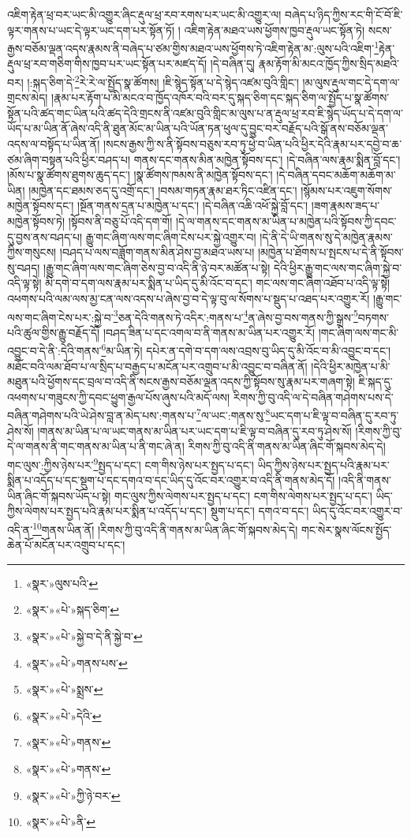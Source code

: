 འཇིག་རྟེན་ཕྲ་བར་ཡང་མི་འགྱུར་ཞིང་རྡུལ་ཕྲ་རབ་རགས་པར་ཡང་མི་འགྱུར་ལ། བཞེད་པ་ཉིད་ཀྱིས་རང་གི་ངོ་བོ་ཇི་ལྟར་གནས་པ་ཡང་དེ་ལྟར་ཡང་དག་པར་སྟོན་ཏོ། །
འཇིག་རྟེན་མཐའ་ཡས་ཕྱོགས་ཁྱབ་རྡུལ་ཡང་སྟོན་ཏེ། སངས་རྒྱས་བཅོམ་ལྡན་འདས་རྣམས་ནི་བཞེད་པ་ཙམ་གྱིས་མཐའ་ཡས་ཕྱོགས་ཏེ་འཇིག་རྟེན་མ་:ལུས་པའི་འཇིག་\footnote{«སྣར་»ལུས་པའི་}རྟེན་རྡུལ་ཕྲ་རབ་གཅིག་གིས་ཁྱབ་པར་ཡང་སྟོན་པར་མཛད་དོ། །དེ་བཞིན་དུ། རྣམ་རྟོག་མི་མངའ་ཁྱོད་ཀྱིས་སྲིད་མཐའི་བར། །:སྐད་ཅིག་དེ་\footnote{«སྣར་»«པེ་»སྐད་ཅིག་}རེ་རེ་ལ་སྤྱོད་སྣ་ཚོགས། །ཇི་སྙེད་སྟོན་པ་དེ་སྙེད་འཛམ་བུའི་གླིང་། །མ་ལུས་རྡུལ་གང་དེ་དག་ལ་གྲངས་མེད། །རྣམ་པར་རྟོག་པ་མི་མངའ་བ་ཁྱོད་འཁོར་བའི་བར་དུ་སྐད་ཅིག་དང་སྐད་ཅིག་ལ་སྤྱོད་པ་སྣ་ཚོགས་སྟོན་པའི་ཚད་གང་ཡིན་པའི་ཚད་དེའི་གྲངས་ནི་འཛམ་བུའི་གླིང་མ་ལུས་པ་ན་རྡུལ་ཕྲ་རབ་ཇི་སྙེད་ཡོད་པ་དེ་དག་ལ་ཡོད་པ་མ་ཡིན་ནོ་ཞེས་འདི་ནི་ཐུན་མོང་མ་ཡིན་པའི་ཡོན་ཏན་ཕུལ་དུ་བྱུང་བར་བརྗོད་པའི་སྒོ་ནས་བཅོམ་ལྡན་འདས་ལ་བསྟོད་པ་ཡིན་ནོ། །སངས་རྒྱས་ཀྱི་ས་ནི་སྟོབས་བཅུས་རབ་ཏུ་ཕྱེ་བ་ཡིན་པའི་ཕྱིར་དེའི་རྣམ་པར་དབྱེ་བ་ཆ་ཙམ་ཞིག་བསྟན་པའི་ཕྱིར་བཤད་པ། གནས་དང་གནས་མིན་མཁྱེན་སྟོབས་དང་། །དེ་བཞིན་ལས་རྣམ་སྨིན་བློ་དང་། །མོས་པ་སྣ་ཚོགས་ཐུགས་ཆུད་དང་། །སྣ་ཚོགས་ཁམས་ནི་མཁྱེན་སྟོབས་དང་། །དེ་བཞིན་དབང་མཆོག་མཆོག་མ་ཡིན། །མཁྱེན་དང་ཐམས་ཅད་དུ་འགྲོ་དང་། །བསམ་གཏན་རྣམ་ཐར་ཏིང་འཛིན་དང་། །སྙོམས་པར་འཇུག་སོགས་མཁྱེན་སྟོབས་དང་། །སྔོན་གནས་དྲན་པ་མཁྱེན་པ་དང་། །དེ་བཞིན་འཆི་འཕོ་སྐྱེ་བློ་དང་། །ཟག་རྣམས་ཟད་པ་མཁྱེན་སྟོབས་ཏེ། །སྟོབས་ནི་བཅུ་པོ་འདི་དག་གོ། །དེ་ལ་གནས་དང་གནས་མ་ཡིན་པ་མཁྱེན་པའི་སྟོབས་ཀྱི་དབང་དུ་བྱས་ནས་བཤད་པ། རྒྱུ་གང་ཞིག་ལས་གང་ཞིག་ངེས་པར་སྐྱེ་འགྱུར་བ། །དེ་ནི་དེ་ཡི་གནས་སུ་དེ་མཁྱེན་རྣམས་ཀྱིས་གསུངས། །བཤད་པ་ལས་བཟློག་གནས་མིན་ཤེས་བྱ་མཐའ་ཡས་པ། །མཁྱེན་པ་ཐོགས་པ་སྤངས་པ་དེ་ནི་སྟོབས་སུ་བཤད། །རྒྱུ་གང་ཞིག་ལས་གང་ཞིག་ཅེས་བྱ་བ་འདི་ནི་ཉེ་བར་མཚོན་པ་སྟེ། དེའི་ཕྱིར་རྒྱུ་གང་ལས་གང་ཞིག་སྐྱེ་བ་འདི་ལྟ་སྟེ། མི་དགེ་བ་དག་ལས་རྣམ་པར་སྨིན་པ་ཡིད་དུ་མི་འོང་བ་དང་། གང་ལས་གང་ཞིག་འཐོབ་པ་འདི་ལྟ་སྟེ། འཕགས་པའི་ལམ་ལས་མྱ་ངན་ལས་འདས་པ་ཞེས་བྱ་བ་དེ་ལྟ་བུ་ལ་སོགས་པ་སྡུད་པ་འཐད་པར་འགྱུར་རོ། །རྒྱུ་གང་ལས་གང་ཞིག་ངེས་པར་:སྐྱེ་བ་\footnote{«སྣར་»«པེ་»སྐྱེ་བ་དེ་ནི་སྐྱེ་བ་}ཅན་དེའི་གནས་ཏེ་འདིར་:གནས་པ་\footnote{«སྣར་»«པེ་»གནས་པས་}ན་ཞེས་བྱ་བས་གནས་ཀྱི་སྒྲས་\footnote{«སྣར་»«པེ་»སྨྲས་}བཏགས་པའི་ཚུལ་གྱིས་རྒྱུ་བརྗོད་དོ། །བཤད་ཟིན་པ་དང་འགལ་བ་ནི་གནས་མ་ཡིན་པར་འགྱུར་རོ། །གང་ཞིག་ལས་གང་མི་འབྱུང་བ་དེ་ནི་:དེའི་གནས་\footnote{«སྣར་»«པེ་»དེའི་}མ་ཡིན་ཏེ། དཔེར་ན་དགེ་བ་དག་ལས་འབྲས་བུ་ཡིད་དུ་མི་འོང་བ་མི་འབྱུང་བ་དང་། མཐོང་བའི་ལམ་ཐོབ་པ་ལ་སྲིད་པ་བརྒྱད་པ་མངོན་པར་འགྲུབ་པ་མི་འབྱུང་བ་བཞིན་ནོ། །དེའི་ཕྱིར་མཁྱེན་པ་མི་མཐུན་པའི་ཕྱོགས་དང་བྲལ་བ་འདི་ནི་སངས་རྒྱས་བཅོམ་ལྡན་འདས་ཀྱི་སྟོབས་སུ་རྣམ་པར་གཞག་སྟེ། ཇི་སྐད་དུ་འཕགས་པ་གཟུངས་ཀྱི་དབང་ཕྱུག་རྒྱལ་པོས་ཞུས་པའི་མདོ་ལས། རིགས་ཀྱི་བུ་འདི་ལ་དེ་བཞིན་གཤེགས་པས་དེ་བཞིན་གཤེགས་པའི་ཡེ་ཤེས་བླ་ན་མེད་པས་:གནས་པ་\footnote{«སྣར་»«པེ་»གནས་}ལ་ཡང་:གནས་སུ་\footnote{«སྣར་»«པེ་»གནས་}ཡང་དག་པ་ཇི་ལྟ་བ་བཞིན་དུ་རབ་ཏུ་ཤེས་སོ། །གནས་མ་ཡིན་པ་ལ་ཡང་གནས་མ་ཡིན་པར་ཡང་དག་པ་ཇི་ལྟ་བ་བཞིན་དུ་རབ་ཏུ་ཤེས་སོ། །རིགས་ཀྱི་བུ་དེ་ལ་གནས་ནི་གང་གནས་མ་ཡིན་པ་ནི་གང་ཞེ་ན། རིགས་ཀྱི་བུ་འདི་ནི་གནས་མ་ཡིན་ཞིང་གོ་སྐབས་མེད་དེ། གང་ལུས་:ཀྱིས་ཉེས་པར་\footnote{«སྣར་»«པེ་»ཀྱི་ཉེ་བར་}སྤྱད་པ་དང་། ངག་གིས་ཉེས་པར་སྤྱད་པ་དང་། ཡིད་ཀྱིས་ཉེས་པར་སྤྱད་པའི་རྣམ་པར་སྨིན་པ་འདོད་པ་དང་སྡུག་པ་དང་དགའ་བ་དང་ཡིད་དུ་འོང་བར་འགྱུར་བ་འདི་ནི་གནས་མེད་དོ། །འདི་ནི་གནས་ཡིན་ཞིང་གོ་སྐབས་ཡོད་པ་སྟེ། གང་ལུས་ཀྱིས་ལེགས་པར་སྤྱད་པ་དང་། ངག་གིས་ལེགས་པར་སྤྱད་པ་དང་། ཡིད་ཀྱིས་ལེགས་པར་སྤྱད་པའི་རྣམ་པར་སྨིན་པ་འདོད་པ་དང་། སྡུག་པ་དང་། དགའ་བ་དང་། ཡིད་དུ་འོང་བར་འགྱུར་བ་འདི་ན་\footnote{«སྣར་»«པེ་»ནི་}གནས་ཡིན་ནོ། །རིགས་ཀྱི་བུ་འདི་ནི་གནས་མ་ཡིན་ཞིང་གོ་སྐབས་མེད་དེ། གང་སེར་སྣས་ལོངས་སྤྱོད་ཆེན་པོ་མངོན་པར་འགྲུབ་པ་དང་། 